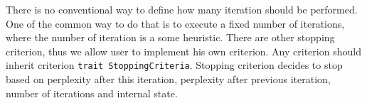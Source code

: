 There is no conventional way to define how many iteration should be performed. One of the common way to do that is to execute a fixed number of
iterations, where the number of iteration is a some heuristic. There are other stopping criterion, thus we allow user to implement his own
criterion. Any criterion should inherit criterion \texttt{trait StoppingCriteria}. Stopping criterion decides to stop based on perplexity after this iteration, perplexity after
previous iteration, number of iterations and internal state. 
